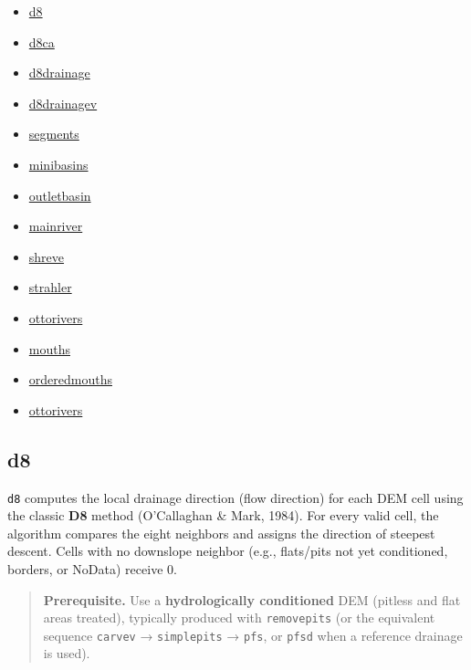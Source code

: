 \documentclass[
]{book}
\providecommand{\tightlist}{%
  \setlength{\itemsep}{0pt}\setlength{\parskip}{0pt}}
\theoremstyle{definition}
\theoremstyle{definition}
\theoremstyle{definition}
\theoremstyle{definition}
\theoremstyle{remark}
\begin{document}
\begin{itemize}
\tightlist
\item
  \hyperref[d8]{d8}\\
\item
  \hyperref[d8ca]{d8ca}\\
\item
  \hyperref[d8drainage]{d8drainage}\\
\item
  \hyperref[d8drainagev]{d8drainagev}\\
\item
  \hyperref[segments]{segments}\\
\item
  \hyperref[minibasins]{minibasins}\\
\item
  \hyperref[outletbasin]{outletbasin}\\
\item
  \hyperref[mainriver]{mainriver}\\
\item
  \hyperref[shreve]{shreve}\\
\item
  \hyperref[strahler]{strahler}\\
\item
  \hyperref[ottorivers]{ottorivers}\\
\item
  \hyperref[mouths]{mouths}\\
\item
  \hyperref[orderedmouths]{orderedmouths}
\item
  \hyperref[ottorivers]{ottorivers}
\end{itemize}

\subsection{d8}\label{d8}

\texttt{d8} computes the local drainage direction (flow direction) for each DEM cell using the classic \textbf{D8} method (O'Callaghan \& Mark, 1984). For every valid cell, the algorithm compares the eight neighbors and assigns the direction of steepest descent. Cells with no downslope neighbor (e.g., flats/pits not yet conditioned, borders, or NoData) receive 0.

\begin{quote}
\textbf{Prerequisite.} Use a \textbf{hydrologically conditioned} DEM (pitless and flat areas treated), typically produced with \texttt{removepits} (or the equivalent sequence \texttt{carvev} → \texttt{simplepits} → \texttt{pfs}, or \texttt{pfsd} when a reference drainage is used).
\end{quote}
\end{document}
